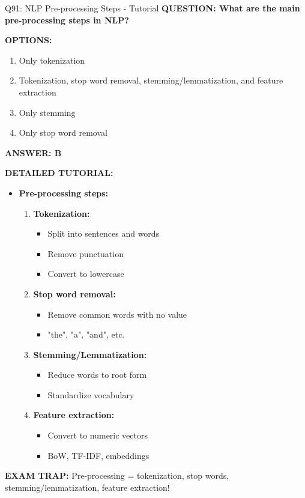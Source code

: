 \documentclass[8pt]{beamer}
\begin{document}
	\begin{frame}{Q91: NLP Pre-processing Steps - Tutorial}
		\fontsize{6.5}{7.5}\selectfont
		\textbf{QUESTION: What are the main pre-processing steps in NLP?}
		
		\vspace{0.1cm}
		\textbf{OPTIONS:}
		\begin{enumerate}
			\item Only tokenization
			\item Tokenization, stop word removal, stemming/lemmatization, and feature extraction
			\item Only stemming
			\item Only stop word removal
		\end{enumerate}
		
		\vspace{0.1cm}
		\textcolor{myblue}{\textbf{ANSWER: B}}
		
		\vspace{0.1cm}
		\textbf{DETAILED TUTORIAL:}
		\begin{itemize}
			\item \textbf{Pre-processing steps:}
			\begin{enumerate}
				\item \textbf{Tokenization:}
				\begin{itemize}
					\item Split into sentences and words
					\item Remove punctuation
					\item Convert to lowercase
				\end{itemize}
				\item \textbf{Stop word removal:}
				\begin{itemize}
					\item Remove common words with no value
					\item "the", "a", "and", etc.
				\end{itemize}
				\item \textbf{Stemming/Lemmatization:}
				\begin{itemize}
					\item Reduce words to root form
					\item Standardize vocabulary
				\end{itemize}
				\item \textbf{Feature extraction:}
				\begin{itemize}
					\item Convert to numeric vectors
					\item BoW, TF-IDF, embeddings
				\end{itemize}
			\end{enumerate}
		\end{itemize}
		
		\textcolor{myred}{\textbf{EXAM TRAP:}} Pre-processing = \textcolor{myblue}{tokenization, stop words, stemming/lemmatization, feature extraction}!
	\end{frame}
	
\end{document}
